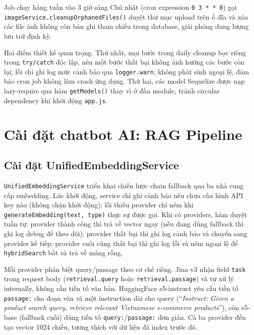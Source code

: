 Job chạy hàng tuần vào 3 giờ sáng Chủ nhật (cron expression \texttt{0 3 * * 0}) gọi \texttt{imageService.cleanupOrphanedFiles()} duyệt thư mục upload trên ổ đĩa và xóa các file ảnh không còn bản ghi tham chiếu trong database, giải phóng dung lượng lưu trữ định kỳ.

Hai điểm thiết kế quan trọng. Thứ nhất, mọi bước trong daily cleanup bọc riêng trong \texttt{try/catch} độc lập, nên một bước thất bại không ảnh hưởng các bước còn lại; lỗi chỉ ghi log mức cảnh báo qua \texttt{logger.warn}, không phát sinh ngoại lệ, đảm bảo cron job không làm crash ứng dụng. Thứ hai, các model Sequelize được nạp lazy-require qua hàm \texttt{getModels()} thay vì ở đầu module, tránh circular dependency khi khởi động \texttt{app.js}.

\section{Cài đặt chatbot AI: RAG Pipeline}
\label{sec:c4_chatbot_impl}

\subsection{Cài đặt UnifiedEmbeddingService}

\texttt{UnifiedEmbeddingService} triển khai chiến lược chain fallback qua ba nhà cung cấp embedding. Lúc khởi động, service chỉ ghi cảnh báo nếu chưa cấu hình API key nào (không chặn khởi động); lỗi thiếu provider chỉ ném khi \texttt{generateEmbedding(text, type)} thực sự được gọi. Khi có providers, hàm duyệt tuần tự: provider thành công thì trả về vector ngay (nếu đang dùng fallback thì ghi log debug để theo dõi); provider thất bại thì ghi log cảnh báo và chuyển sang provider kế tiếp; provider cuối cùng thất bại thì ghi log lỗi và ném ngoại lệ để \texttt{hybridSearch} bắt và trả về mảng rỗng.

Mỗi provider phân biệt query\slash passage theo cơ chế riêng. Jina v3 nhận field \texttt{task} trong request body (\texttt{retrieval.query} hoặc \texttt{retrieval.passage}) và tự xử lý internally, không cần tiền tố văn bản. HuggingFace e5-instruct yêu cầu tiền tố \texttt{passage:} cho đoạn văn và một instruction dài cho query (``\textit{Instruct: Given a product search query, retrieve relevant Vietnamese e-commerce products}''), còn e5-base (fallback cuối) dùng tiền tố \texttt{query:}/\texttt{passage:} đơn giản. Cả ba provider đều tạo vector 1024 chiều, tương thích với dữ liệu đã index trước đó.

